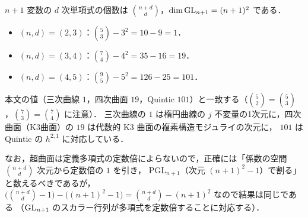 $n+1$ 変数の $d$ 次単項式の個数は $\binom{n+d}{d}$，$\dim\operatorname{GL}_{n+1}=(n+1)^2$ である．
\begin{itemize}
  \item $(n,d)=(2,3)$：$\binom{5}{3}-3^2=10-9=1$．
  \item $(n,d)=(3,4)$：$\binom{7}{4}-4^2=35-16=19$．
  \item $(n,d)=(4,5)$：$\binom{9}{5}-5^2=126-25=101$．
\end{itemize}
本文の値（三次曲線 $1$，四次曲面 $19$，Quintic $101$）と一致する（$\binom52=\binom53$，$\binom73=\binom74$ に注意）．
三次曲線の $1$ は楕円曲線の $j$ 不変量の1次元に，四次曲面（K3曲面）の $19$ は代数的 K3 曲面の複素構造モジュライの次元に，
$101$ は Quintic の $h^{2,1}$ に対応している．

なお，超曲面は定義多項式の定数倍によらないので，正確には「係数の空間 $\binom{n+d}{d}$ 次元から定数倍の $1$ を引き，
$\mathrm{PGL}_{n+1}$（次元 $(n+1)^2-1$）で割る」と数えるべきであるが，
$\bigl(\binom{n+d}{d}-1\bigr)-\bigl((n+1)^2-1\bigr)=\binom{n+d}{d}-(n+1)^2$ なので結果は同じである
（$\operatorname{GL}_{n+1}$ のスカラー行列が多項式を定数倍することに対応する）．
